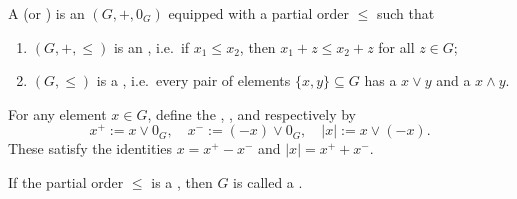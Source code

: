 \begin{definition} \label{definition:lattice_ordered_group}
A  (or ) is an  $(G,+,0_G)$ equipped with a partial order $\leq$ such that
\begin{enumerate}
    \item $(G,+, \leq)$ is an , i.e.\ if $x_1 \leq x_2$, then $x_1 + z \leq x_2 + z$ for all $z \in G$;
    \item $(G,\leq)$ is a , i.e.\ every pair of elements $\{x,y\} \subseteq G$ has a  $x \vee y$ and a  $x \wedge y$.
\end{enumerate}

For any element $x \in G$, define the , , and  respectively by
$$x^+ := x \vee 0_G, \quad x^- := (-x) \vee 0_G, \quad |x| := x \vee (-x).$$
These satisfy the identities $x = x^+ - x^-$ and $|x| = x^+ + x^-$.

If the partial order $\leq$ is a , then $G$ is called a .
\end{definition}
